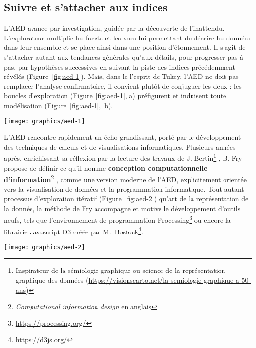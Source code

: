 \documentclass[symmetric,justified,marginals=raggedouter]{tufte-book}
\begin{document}
\subsection{Suivre et s'attacher aux indices}

\noindent L'AED avance par investigation, guidée par la découverte de l'inattendu. L'explorateur multiplie les facets et les vues lui permettant de décrire les données dans leur ensemble et se place ainsi dans une position d'étonnement. Il s'agit de s'attacher autant aux tendances générales qu'aux détails, pour progresser pas à pas, par hypothèses successives en suivant la piste des indices précédemment révélés (Figure~\ref{fig:aed-1}). Mais, dans le l'esprit de Tukey, l'AED ne doit pas remplacer l'analyse confirmatoire, il convient plutôt de conjuguer les deux : les boucles d'exploration (Figure~\ref{fig:aed-1}, a) préfigurent et induisent toute modélisation (Figure~\ref{fig:aed-1},~b). 

\newpage

\begin{figure*}%
  \texttt{[image: graphics/aed-1]}
  \caption{L'analyse exploratoire et les diverses phases de l'exploration préfigurent toute analyse confirmatoire}
  \label{fig:aed-1}
\end{figure*} 

\noindent L'AED rencontre rapidement un écho grandissant, porté par le dé\-veloppement des techniques de calculs et de visualisations informatiques. Plusieurs années après, enrichissant sa réflexion par la lecture des travaux de J. Bertin\footnote{\RaggedOuter Inspirateur de la sémiologie graphique ou science de la représentation graphique des données (\url{https://visionscarto.net/la-semiologie-graphique-a-50-ans})} \citep{bertin_semiologie_1973}, B. Fry propose de définir ce qu'il nomme \textbf{conception computationnelle d'information}\footnote{\RaggedOuter \textit{Computational information design} en anglais} \citep{fry_computational_2004}, comme une version moderne de l'AED, explicitement orientée vers la visualisation de données et la programmation informatique. Tout autant processus d'exploration itératif (Figure~\ref{fig:aed-2}) qu'art de la représentation de la donnée, la méthode de Fry accompagne et motive le dé\-veloppement d'outils neufs, tels que l'environnement de programmation Processing\footnote{\RaggedOuter \url{https://processing.org/}} ou encore la librairie Javascript D3 créée par M.~Bostock\footnote{\RaggedOuter https://d3js.org/}.

\begin{figure*}%
  \texttt{[image: graphics/aed-2]}
  \caption{Étapes de la conception computationnelle d'information et ensemble des boucles d'analyses possibles selon \citep{fry_computational_2004}}
  \label{fig:aed-2}
\end{figure*} 
\end{document}
